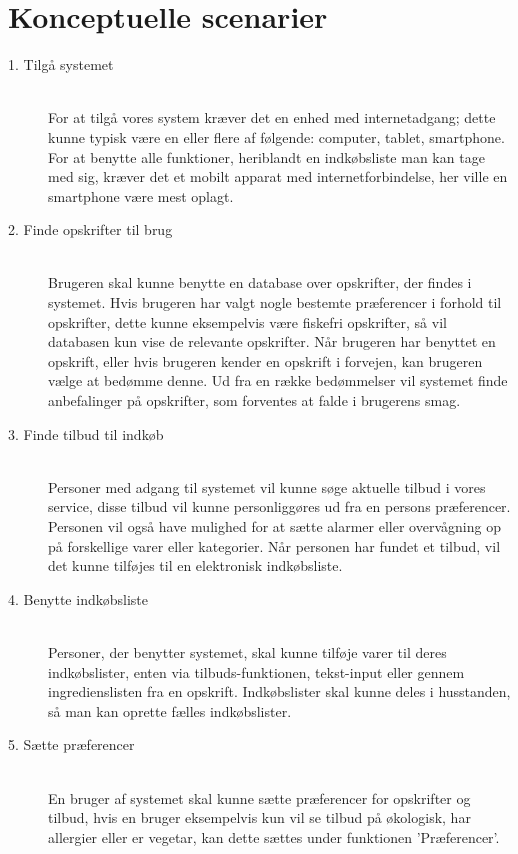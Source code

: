\chapter{Konceptuelle scenarier}

\begin{description}

  \item[1. Tilgå systemet] \hfill \\
For at tilgå vores system kræver det en enhed med internetadgang; dette kunne typisk være en eller flere af følgende: computer, tablet, smartphone.
For at benytte alle funktioner, heriblandt en indkøbsliste man kan tage med sig, kræver det et mobilt apparat med internetforbindelse, her ville en smartphone være mest oplagt.
  
  \item[2. Finde opskrifter til brug] \hfill \\
Brugeren skal kunne benytte en database over opskrifter, der findes i systemet. Hvis brugeren har valgt nogle bestemte præferencer i forhold til opskrifter, dette kunne eksempelvis være fiskefri opskrifter, så vil databasen kun vise de relevante opskrifter. 
Når brugeren har benyttet en opskrift, eller hvis brugeren kender en opskrift i forvejen, kan brugeren vælge at bedømme denne. Ud fra en række bedømmelser vil systemet finde anbefalinger på opskrifter, som forventes at falde i brugerens smag.
  
  \item[3. Finde tilbud til indkøb] \hfill \\
Personer med adgang til systemet vil kunne søge aktuelle tilbud i vores service, disse tilbud vil kunne personliggøres ud fra en persons præferencer.
Personen vil også have mulighed for at sætte alarmer eller overvågning op på forskellige varer eller kategorier. 
Når personen har fundet et tilbud, vil det kunne tilføjes til en elektronisk indkøbsliste.

  \item[4. Benytte indkøbsliste] \hfill \\
Personer, der benytter systemet, skal kunne tilføje varer til deres indkøbslister, enten via tilbuds-funktionen, tekst-input eller gennem ingredienslisten fra en opskrift.
Indkøbslister skal kunne deles i husstanden, så man kan oprette fælles indkøbslister.    

  \item[5. Sætte præferencer] \hfill \\
En bruger af systemet skal kunne sætte præferencer for opskrifter og tilbud, hvis en bruger eksempelvis kun vil se tilbud på økologisk, har allergier eller er vegetar, kan dette sættes under funktionen 'Præferencer'.

\end{description}
